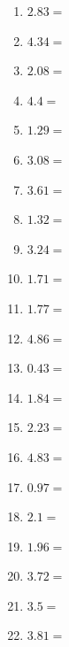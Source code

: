 \documentclass[12pt]{article}
\begin{document}
\begin{enumerate}
\item \large $ 2.83 = $ \vspace{1.5cm}
\item \large $ 4.34 = $ \vspace{1.5cm}
\item \large $ 2.08 = $ \vspace{1.5cm}
\item \large $ 4.4 = $ \vspace{1.5cm}
\newpage
\item \large $ 1.29 = $ \vspace{1.5cm}
\item \large $ 3.08 = $ \vspace{1.5cm}
\item \large $ 3.61 = $ \vspace{1.5cm}
\item \large $ 1.32 = $ \vspace{1.5cm}
\item \large $ 3.24 = $ \vspace{1.5cm}
\item \large $ 1.71 = $ \vspace{1.5cm}
\item \large $ 1.77 = $ \vspace{1.5cm}
\item \large $ 4.86 = $ \vspace{1.5cm}
\item \large $ 0.43 = $ \vspace{1.5cm}
\item \large $ 1.84 = $ \vspace{1.5cm}
\newpage
\item \large $ 2.23 = $ \vspace{1.5cm}
\item \large $ 4.83 = $ \vspace{1.5cm}
\item \large $ 0.97 = $ \vspace{1.5cm}
\item \large $ 2.1 = $ \vspace{1.5cm}
\item \large $ 1.96 = $ \vspace{1.5cm}
\item \large $ 3.72 = $ \vspace{1.5cm}
\item \large $ 3.5 = $ \vspace{1.5cm}
\item \large $ 3.81 = $ \vspace{1.5cm}

\end{enumerate}
\end{document}
